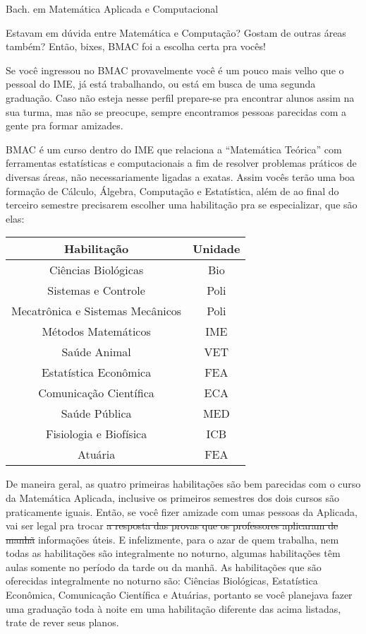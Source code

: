 \begin{subsecao}{Bach. em Matemática Aplicada e Computacional}

Estavam em dúvida entre Matemática e Computação? Gostam de outras áreas também?
Então, bixes, BMAC foi a escolha certa pra vocês!

Se você ingressou no BMAC provavelmente você é um pouco mais velho que o pessoal
do IME, já está trabalhando, ou está em busca de uma segunda graduação. Caso não
esteja nesse perfil prepare-se pra encontrar alunos assim na sua turma, mas não
se preocupe, sempre encontramos pessoas parecidas com a gente pra formar
amizades.

BMAC é um curso dentro do IME que relaciona a ``Matemática Teórica'' com
ferramentas estatísticas e computacionais a fim de resolver problemas práticos
de diversas áreas, não necessariamente ligadas a exatas. Assim vocês terão uma
boa formação de Cálculo, Álgebra, Computação e Estatística, além de ao final do
terceiro semestre precisarem escolher uma habilitação pra se especializar, que
são elas:

\begin {center}
  \begin {tabular}{|c|c|}
    \hline
    Habilitação & Unidade \\
    \hline
    Ciências Biológicas & Bio\\
    Sistemas e Controle & Poli\\
    Mecatrônica e Sistemas Mecânicos & Poli\\
    Métodos Matemáticos & IME\\
    Saúde Animal & VET \\
    Estatística Econômica & FEA \\
    Comunicação Científica & ECA \\
    Saúde Pública & MED \\
    Fisiologia e Biofísica & ICB \\
    Atuária & FEA \\
    \hline
  \end {tabular}
\end {center}

De maneira geral, as quatro primeiras habilitações são bem parecidas com o
curso da Matemática Aplicada, inclusive os primeiros semestres dos dois cursos
são praticamente iguais. Então, se você fizer amizade com umas pessoas da
Aplicada, vai ser legal pra trocar \sout{a resposta das provas que os
professores aplicaram de manhã} informações úteis. E infelizmente, para o azar
de quem trabalha, nem todas as habilitações são integralmente no noturno,
algumas habilitações têm aulas somente no período da tarde ou da manhã. As
habilitações que são oferecidas integralmente no noturno são: Ciências
Biológicas, Estatística Econômica, Comunicação Científica e Atuárias, portanto se você
planejava fazer uma graduação toda à noite em uma habilitação diferente das
acima listadas, trate de rever seus planos.


\end{subsecao}

